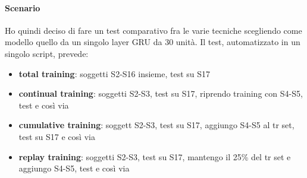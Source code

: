 \documentclass[11pt, a4paper, twoside, openright]{book}
\begin{document}
\paragraph{Scenario} Ho quindi deciso di fare un test comparativo fra le varie tecniche scegliendo come modello quello da un singolo layer GRU da 30 unità.
Il test, automatizzato in un singolo script, prevede:
\begin{itemize}
    \item \textbf{total training}: soggetti S2-S16 insieme, test su S17
    \item \textbf{continual training}: soggetti S2-S3, test su S17, riprendo training con S4-S5, test e così via
    \item \textbf{cumulative training}: soggett S2-S3, test su S17, aggiungo S4-S5 al tr set, test su S17 e così via
    \item \textbf{replay training}: soggetti S2-S3, test su S17, mantengo il 25\% del tr set e aggiungo S4-S5, test e così via
\end{itemize}
\end{document}
